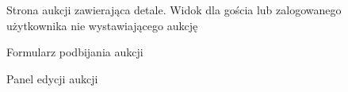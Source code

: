 \begin{figure}[h]
\centering
{}
\caption{Strona aukcji zawierająca detale. Widok dla gościa lub zalogowanego użytkownika nie wystawiającego aukcję}
\label{screen09}
\end{figure}

\begin{figure}[h]
\centering
{}
\caption{Formularz podbijania aukcji}
\label{screen10}
\end{figure}

\begin{figure}[h]
\centering
{}
\caption{Panel edycji aukcji}
\label{screen06}
\end{figure}

